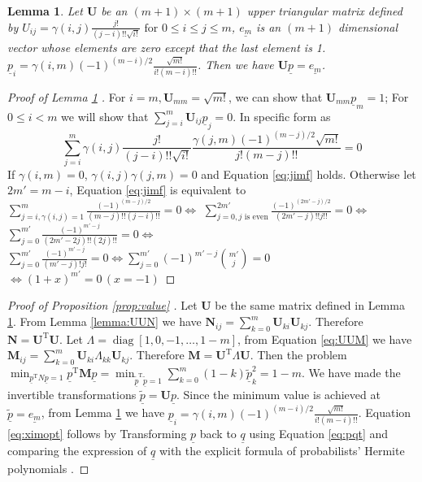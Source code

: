 \documentclass[conference]{IEEEtran}
\newtheorem{lemma}{Lemma}
\def\T{\mathrm{T}}
\DeclareMathOperator*{\diag}{diag}
\newcommand{\ide}[2]{ \gamma(#1,#2) }
\begin{document}
\begin{lemma}\label{lemma:Upem}
Let $\mathbf{U}$ be an $(m+1) \times (m+1)$ upper triangular matrix defined by
$U_{ij} = \ide{i}{j} \frac{j!}{(j-i)!!\sqrt{i!}} \textrm{ for } 0 \leq i\leq j \leq m$, $\underline{e_m}$ is an $(m+1)$ dimensional vector whose elements are zero except that the last element is 1. $\underline{p}_i = \ide{i}{m} (-1)^{(m-i)/2}\frac{\sqrt{m!}}{i!(m-i)!!}$.
Then we have $ \mathbf{U} \underline{p} = \underline{e_m}$.
\end{lemma}
\begin{proof}[Proof of Lemma \ref{lemma:Upem} ]
    For $ i = m, \mathbf{U}_{mm} = \sqrt{m!}$, we can show that $\mathbf{U}_{mm} \underline{p}_m = 1 $; For $ 0\leq i < m $ we
    will show that $ \sum_{j=i}^m \mathbf{U}_{ij} \underline{p}_j = 0 $. In specific form as
    \begin{equation}\label{eq:jimf}
    \sum_{j=i}^m \ide{i}{j} \frac{j!}{(j-i)!!\sqrt{i!}}  \frac{\ide{j}{m}(-1)^{(m-j)/2}\sqrt{m!}}{j!(m-j)!!} = 0
    \end{equation}
    If $ \ide{i}{m} = 0$, $\ide{i}{j}\ide{j}{m} = 0$ and Equation \eqref{eq:jimf} holds. Otherwise let $2m' = m - i$,    
    Equation \eqref{eq:jimf} is equivalent to
    $ \sum_{j=i, \ide{i}{j}=1}^m  \frac{(-1)^{(m-j)/2}}{(m-j)!!(j-i)!!}  = 0  \iff  $
    $\sum_{j=0, j \textrm{ is even}}^{2m'}  \frac{(-1)^{(2m'-j)/2}}{(2m'-j)!! j!!}= 0  \iff $
    $\sum_{j=0}^{m'}  \frac{(-1)^{m'-j}}{(2m'-2j)!! (2j)!!} = 0  \iff $
    $\sum_{j=0}^{m'}  \frac{(-1)^{m'-j}}{(m'-j)! j!} = 0  \iff \sum_{j=0}^{m'} (-1)^{m'-j} \binom{m'}{j} = 0$
    $ \iff (1+x)^{m'} = 0 \,(x=-1)$
\end{proof}
\begin{proof}[Proof of Proposition \ref{prop:value} ]
    Let $\mathbf{U}$ be the same matrix defined in Lemma \ref{lemma:Upem}. From Lemma \ref{lemma:UUN} we have $\mathbf{N}_{ij} = \sum_{k=0}^m \mathbf{U}_{ki}\mathbf{U}_{kj}$. Therefore $\mathbf{N} = \mathbf{U}^\T\mathbf{U}$. Let $\Lambda = \diag[1, 0, -1, \dots, 1-m]$, from Equation \ref{eq:UUM} we have $\mathbf{M}_{ij} = \sum_{k=0}^m \mathbf{U}_{ki}\Lambda_{kk}\mathbf{U}_{kj}$. Therefore $\mathbf{M} = \mathbf{U}^\T\Lambda\mathbf{U}$. Then the problem $\min_{\underline{p}^\T N \underline{p} = 1} \underline{p}^\T \mathbf{M}\underline{p} = \min_{\underline{\tilde{p}}^\T\underline{\tilde{p}} = 1} \sum_{k=0}^m (1-k)\underline{\tilde{p}}_k^2 = 1-m$. We have made the invertible transformations $\underline{\tilde{p}} = \mathbf{U}\underline{p}$. Since the minimum value is achieved at $\underline{\tilde{p}} = \underline{e_m}$, from Lemma \ref{lemma:Upem} we have $\underline{p}_i = \ide{i}{m} (-1)^{(m-i)/2}\frac{\sqrt{m!}}{i!(m-i)!!}$. Equation \eqref{eq:ximopt} follows by Transforming $\underline{p}$ back to $\underline{q}$ using Equation \eqref{eq:pqt} and comparing the expression of $\underline{q}$ with the explicit formula of probabilists' Hermite polynomials \cite[Eq. 18.5.13]{NIST:DLMF}.
\end{proof}
\end{document}
